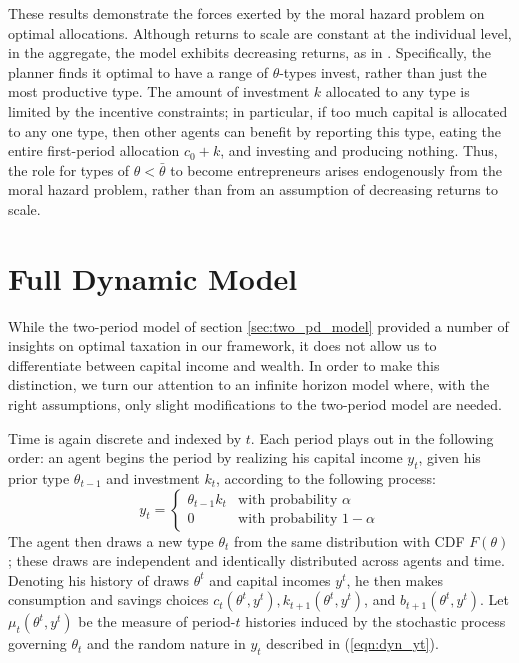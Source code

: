 \documentclass[11pt]{article}
\begin{document}
These results demonstrate the forces exerted by the moral hazard problem on optimal allocations. Although returns to scale are constant at the individual level, in the aggregate, the model exhibits decreasing returns, as in \cite{shourideh2014optimal}. Specifically, the planner finds it optimal to have a range of \( \theta \)-types invest, rather than just the most productive type. The amount of investment \( k \) allocated to any type is limited by the incentive constraints; in particular, if too much capital is allocated to any one type, then other agents can benefit by reporting this type, eating the entire first-period allocation \( c_0 + k \), and investing and producing nothing. Thus, the role for types of \( \theta<\bar{\theta} \) to become entrepreneurs arises endogenously from the moral hazard problem, rather than from an assumption of decreasing returns to scale.  

\section{Full Dynamic Model} \label{sec:dyn_mod}

While the two-period model of section \ref{sec:two_pd_model} provided a number of insights on optimal taxation in our framework, it does not allow us to differentiate between capital income and wealth. In order to make this distinction, we turn our attention to an infinite horizon model where, with the right assumptions, only slight modifications to the two-period model are needed. 

Time is again discrete and indexed by \( t \). Each period plays out in the following order: an agent begins the period by realizing his capital income \( y_t \), given his prior type \( \theta_{t-1} \) and investment \( k_t \), according to the following process: 
\begin{equation} \label{eqn:dyn_yt}
    y_{t}=\begin{cases}
        \theta_{t-1}k_{t} & \textrm{with probability }\alpha\\
        0 & \textrm{with probability } 1-\alpha
        \end{cases}
\end{equation}
The agent then draws a new type \( \theta_t \) from the same distribution with CDF \( F(\theta) \); these draws are independent and identically distributed across agents and time. Denoting his history of draws \( \theta^t \) and capital incomes \( y^t \), he then makes consumption and savings choices \( c_{t}\left(\theta^{t},y^{t}\right),k_{t+1}\left(\theta^{t},y^{t}\right) \), and \( b_{t+1}\left(\theta^{t},y^{t}\right) \). Let \( \mu_t\left( \theta^t, y^t \right) \) be the measure of period-\( t \) histories induced by the stochastic process governing \( \theta_t \) and the random nature in \( y_t \) described in (\ref{eqn:dyn_yt}). 
\end{document}
